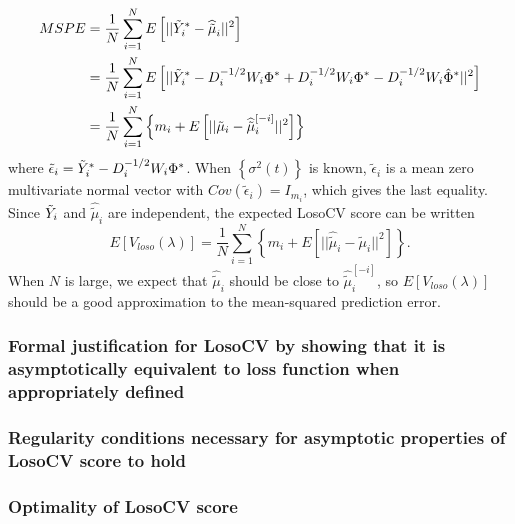 \begin{align}
\begin{split}\label{eq:MSPE}
MSPE &= \frac{1}{N}\sum_{i=1}^N E\left[ \vert \vert \tilde{Y}^*_i - \widehat{\tilde{\mu}}_{i} \vert \vert^2 \right]\\
&=  \frac{1}{N}\sum_{i=1}^N E\left[ \vert \vert \tilde{Y}^*_i - D_i^{-1/2}W_i \Phi^* + D_i^{-1/2}W_i \Phi^* - D_i^{-1/2}W_i \hat{\Phi}^*\vert \vert^2 \right]\\
&=  \frac{1}{N}\sum_{i=1}^N \left\{m_i + E\left[ \vert \vert \tilde{\mu}_{i} - \widehat{\tilde{\mu}}^{\left[ -i \right]}_{i} \vert \vert^2 \right] \right\}
\end{split}
\end{align}
\noindent
where $\tilde{\epsilon}_i = \tilde{Y}^*_i - D_i^{-1/2}W_i \Phi^*$. When $\left\{ \sigma^2\left(t\right)\right\}$ is known, $\tilde{\epsilon}_i$ is a mean zero multivariate normal vector with $Cov\left(\tilde{\epsilon}_i\right) = I_{m_i}$, which gives the last equality. Since $\tilde{Y}_i$ and $ \widehat{\tilde{\mu}}_{i} $ are independent, the expected LosoCV score can be written
\begin{equation} \label{eq:MSPE_LOSOCV}
E\left[V_{loso}\left(\lambda\right) \right] =  \frac{1}{N}\sum_{i=1}^N\left\{ m_i +  E\left[ \vert \vert \widehat{\tilde{\mu}}_{i} - \tilde{\mu}_{i} \vert \vert^2 \right] \right\}. 
\end{equation}
\noindent
When $N$ is large, we expect that $\widehat{\tilde{\mu}}_{i}$ should be close to $\widehat{\tilde{\mu}}^{\left[ -i \right]}_{i}$, so $E\left[V_{loso}\left(\lambda\right) \right]$ should be a good approximation to the mean-squared prediction error. 
 
 \subsubsection{Formal justification for LosoCV by showing that it is asymptotically equivalent to loss function when appropriately defined}
 
 
 \subsubsection{Regularity conditions necessary for asymptotic properties of LosoCV score to hold} 
 
 \subsubsection{Optimality of LosoCV score}
 
